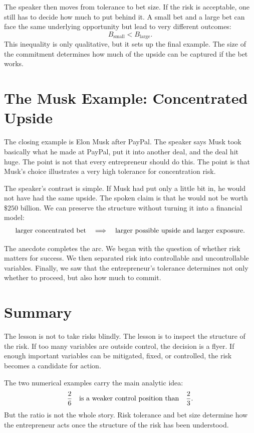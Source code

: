 The speaker then moves from tolerance to bet size. If the risk is acceptable, one still has to decide how much to put behind it. A small bet and a large bet can face the same underlying opportunity but lead to very different outcomes:
\begin{equation}
B_{\mathrm{small}} < B_{\mathrm{large}}.
\end{equation}
This inequality is only qualitative, but it sets up the final example. The size of the commitment determines how much of the upside can be captured if the bet works.

\section{The Musk Example: Concentrated Upside}

The closing example is Elon Musk after PayPal. The speaker says Musk took basically what he made at PayPal, put it into another deal, and the deal hit huge. The point is not that every entrepreneur should do this. The point is that Musk's choice illustrates a very high tolerance for concentration risk.

The speaker's contrast is simple. If Musk had put only a little bit in, he would not have had the same upside. The spoken claim is that he would not be worth \(\$250\) billion. We can preserve the structure without turning it into a financial model:
\begin{equation}
\hbox{larger concentrated bet}
\quad \Longrightarrow \quad
\hbox{larger possible upside and larger exposure}.
\end{equation}

The anecdote completes the arc. We began with the question of whether risk matters for success. We then separated risk into controllable and uncontrollable variables. Finally, we saw that the entrepreneur's tolerance determines not only whether to proceed, but also how much to commit.

\section{Summary}

The lesson is not to take risks blindly. The lesson is to inspect the structure of the risk. If too many variables are outside control, the decision is a flyer. If enough important variables can be mitigated, fixed, or controlled, the risk becomes a candidate for action.

The two numerical examples carry the main analytic idea:
\begin{equation}
\frac{2}{6} \quad \hbox{is a weaker control position than} \quad \frac{2}{3}.
\end{equation}
But the ratio is not the whole story. Risk tolerance and bet size determine how the entrepreneur acts once the structure of the risk has been understood.